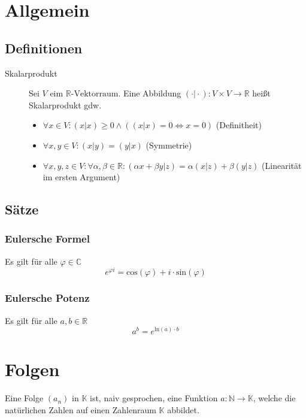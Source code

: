 


\chapter{Allgemein}
	\section{Definitionen}
		\begin{description}
			\item[Skalarprodukt] Sei $ V $ eim $ \mathbb{R}\text{-Vektorraum} $. Eine Abbildung $ (\cdot \vert \cdot) : V \times V \rightarrow \mathbb{R} $ heißt Skalarprodukt gdw.
				\begin{itemize}
					\item $ \forall x \in V : (x \vert x) \geq 0 \land ((x \vert x) = 0 \iff x = 0) $ (Definitheit)
					\item $ \forall x, y \in V : (x \vert y) = (y \vert x) $ (Symmetrie)
					\item $ \forall x, y, z \in V : \forall \alpha, \beta \in \mathbb{R} : (\alpha x + \beta y \vert z) = \alpha (x \vert z) + \beta (y \vert z) $ (Linearität im ersten Argument)
				\end{itemize}
		\end{description}

	\section{Sätze}
		\subsection{Eulersche Formel}
			Es gilt für alle $ \varphi \in \mathbb{C} $ \[ e ^ { \varphi i } = \text{cos}(\varphi) + i \cdot \text{sin}(\varphi) \]

		\subsection{Eulersche Potenz}
			Es gilt für alle $ a, b \in \mathbb{R} $ \[ a ^ b = e ^ { \text{ln}(a) \cdot b } \]

\chapter{Folgen}
	Eine Folge $ (a _ n) $ in $ \mathbb{K} $ ist, naiv gesprochen, eine Funktion $ a : \mathbb{N} \rightarrow \mathbb{K} $, welche die natürlichen Zahlen auf einen Zahlenraum $ \mathbb{K} $ abbildet.

